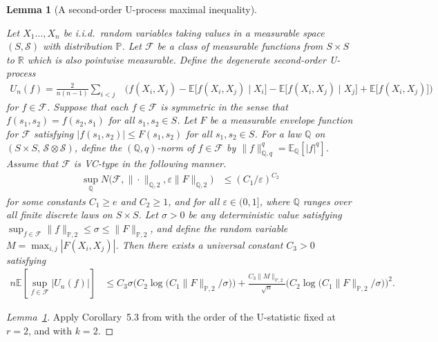 \documentclass[11pt,lof]{puthesis}
\renewcommand{\P}{\ensuremath{\mathbb{P}}}
\newcommand{\R}{\ensuremath{\mathbb{R}}}
\newcommand{\E}{\ensuremath{\mathbb{E}}}
\newcommand{\Q}{\ensuremath{\mathbb{Q}}}
\newcommand{\cF}{\ensuremath{\mathcal{F}}}
\newcommand{\cS}{\ensuremath{\mathcal{S}}}
\theoremstyle{break}
\newtheorem{lemma}{Lemma}[section]
\theoremstyle{proof}
\newtheorem{proof}{Proof}
\begin{document}
\begin{lemma}[A second-order U-process maximal inequality]
\label{lem:kernel_app_uprocess_maximal}

Let $X_1 \ldots, X_n$
be i.i.d.\ random variables taking values
in a measurable space $(S, \cS)$
with distribution $\P$.
Let $\cF$ be a class of measurable functions from
$S \times S$ to $\R$ which is also pointwise measurable.
Define the degenerate second-order U-process
%
\begin{align*}
U_n(f)
=
\frac{2}{n(n-1)}
\sum_{i<j}
&\Big(
f(X_i, X_j)
- \E\big[f(X_i,X_j) \mid X_i\big]
-
\E\big[f(X_i,X_j) \mid X_j\big]
+ \E\big[f(X_i,X_j)\big]
\Big)
\end{align*}
%
for $f \in \cF$.
Suppose that each $f \in \cF$ is symmetric in the sense that
$f(s_1,s_2) = f(s_2,s_1)$
for all $s_1, s_2 \in S$.
Let $F$ be a measurable envelope function for $\cF$
satisfying $|f(s_1,s_2)| \leq F(s_1,s_2)$
for all $s_1,s_2 \in S$.
For a law $\Q$ on
$(S \times S, \, \cS \otimes \cS)$,
define the $(\Q,q)$-norm of $f \in \cF$ by
$\|f\|_{\Q,q}^q = \E_\Q[|f|^q]$.
Assume that $\cF$ is VC-type in the following manner.
%
\begin{align*}
\sup_\Q
N\big(
\cF, \|\cdot\|_{\Q,2}, \varepsilon \|F\|_{\Q,2}
\big)
&\leq
(C_1/\varepsilon)^{C_2}
\end{align*}
%
for some constants
$C_1 \geq e$
and
$C_2 \geq 1$,
and for all $\varepsilon \in (0,1]$,
where $\Q$ ranges over all finite discrete laws
on
$S \times S$.
Let $\sigma > 0$ be any deterministic value satisfying
$\sup_{f \in \cF} \|f\|_{\P,2} \leq \sigma \leq \|F\|_{\P,2}$,
and define the random variable $M = \max_{i,j} |F(X_i, X_j)|$.
Then there exists a universal constant $C_3 > 0$
satisfying
%
\begin{align*}
n
\E\left[
\sup_{f \in \cF}
\big| U_n(f) \big|
\right]
&\leq
C_3 \sigma
\Big(
C_2 \log\big(C_1 \|F\|_{\P,2} / \sigma \big)
\Big)
+ \frac{C_3 \|M\|_{\P,2}}{\sqrt{n}}
\Big(
C_2 \log\big(C_1 \|F\|_{\P,2} / \sigma \big)
\Big)^2.
\end{align*}

\end{lemma}

\begin{proof}[Lemma~\ref{lem:kernel_app_uprocess_maximal}]

Apply Corollary~5.3
from \citet{chen2020jackknife}
with the order of the U-statistic fixed at
$r=2$,
and with $k=2$.
\end{proof}
\end{document}

